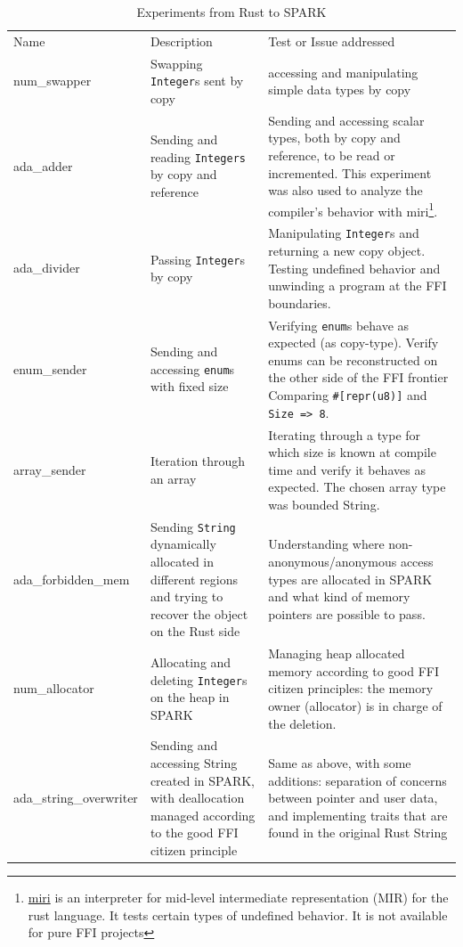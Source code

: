 \documentclass[nomenclature, english, bibtex]{kththesis}
\begin{document}
\begin{table}[ht!]
\footnotesize
\centering
\caption{Experiments from Rust to SPARK}
\label{tab:fromrusttospark}
\begin{tabular}{ |p{3cm}|p{4cm}|p{7cm}| }
\hline
\rowcolor{color2bg_fill}
\multicolumn{3}{|c|}{\centering From SPARK to Rust} \\
\hline
\rowcolor{color2bg_fill}
\centering Name & \centering Description & \centering Test or Issue addressed \tabularnewline
\hline
num\_swapper & Swapping \texttt{Integer}s sent by copy & accessing and manipulating simple data types by copy \tabularnewline
\hline
ada\_adder & Sending and reading \texttt{Integers} by copy and reference & Sending and accessing scalar types, both by copy and reference, to be read or incremented. This experiment was also used to analyze the compiler's behavior with miri\footnote{\href{https://github.com/rust-lang/miri/}{miri} is an interpreter for mid-level intermediate representation (MIR) for the rust language. It tests certain types of undefined behavior. It is not available for pure FFI projects}. \tabularnewline
\hline
ada\_divider & Passing \texttt{Integer}s by copy & Manipulating \texttt{Integer}s and returning a new copy object. \newline Testing undefined behavior and unwinding a program at the FFI boundaries. \tabularnewline
\hline
enum\_sender & Sending and accessing \texttt{enum}s with fixed size & Verifying \texttt{enum}s behave as expected (as \gls{copy-type}). \newline Verify enums can be reconstructed on the other side of the FFI frontier \newline Comparing \texttt{\#[repr(u8)]} and \texttt{Size => 8}. \tabularnewline
\hline
array\_sender & Iteration through an array & Iterating through a type for which size is known at compile time and verify it behaves as expected. The chosen array type was bounded String. \tabularnewline
\hline
ada\_forbidden\_mem & Sending \texttt{String} dynamically allocated in different regions and trying to recover the object on the Rust side & Understanding where non-anonymous/anonymous access types are allocated in SPARK and what kind of memory pointers are possible to pass.\tabularnewline
\hline
num\_allocator & Allocating and deleting \texttt{Integer}s on the heap in SPARK & Managing heap allocated memory according to good FFI citizen principles: the memory owner (allocator) is in charge of the deletion. \tabularnewline
\hline
ada\_string\_overwriter & Sending and accessing String created in SPARK, with deallocation managed according to the good FFI citizen principle & Same as above, with some additions: separation of concerns between pointer and user data, and implementing traits that are found in the original Rust String \tabularnewline
\hline
\end{tabular}
\end{table}
\FloatBarrier
\end{document}
